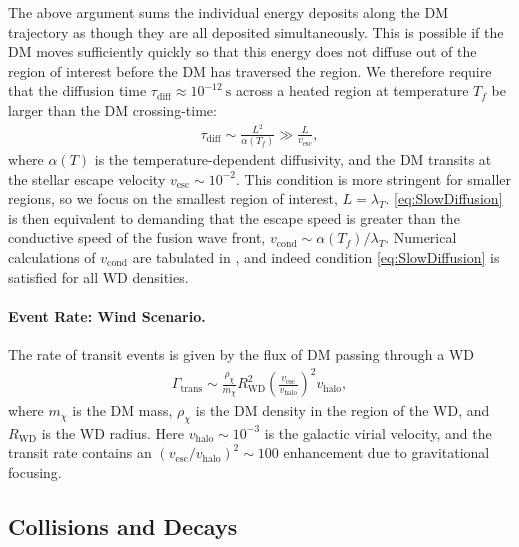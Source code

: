 \documentclass[preprintnumbers,amsmath,amssymb,prd,superscriptaddress]{revtex4}
\def\r{\right)}
\def\l{\left(}
\begin{document}
The above argument sums the individual energy deposits along the DM trajectory as though they are all deposited simultaneously.
This is possible if the DM moves sufficiently quickly so that this energy does not diffuse out of the region of interest before the DM has traversed the region.
We therefore require that the diffusion time $\tau_\text{diff} \approx 10^{-12} ~\text{s}$ across a heated region at temperature $T_f$ be larger than the DM crossing-time:
\begin{align}
  \tau_\text{diff} \sim \frac{L^2}{\alpha(T_f)} \gg
  \frac{L}{v_\text{esc}},
\label{eq:SlowDiffusion}
\end{align}
where $\alpha(T)$ is the temperature-dependent diffusivity, and the DM transits at the stellar escape velocity $v_\text{esc} \sim 10^{-2}$.
This condition is more stringent for smaller regions, so we focus on the smallest region of interest, $L = \lambda_T$.
\eqref{eq:SlowDiffusion} is then equivalent to demanding that the escape speed is greater than the conductive speed of the fusion wave front, $v_\text{cond} \sim \alpha(T_f) / \lambda_T$.
Numerical calculations of $v_\text{cond}$ are tabulated in \cite{Woosley}, and indeed condition \eqref{eq:SlowDiffusion} is satisfied for all WD densities.

\paragraph{Event Rate: Wind Scenario.}
The rate of transit events is given by the flux of DM passing through a WD
\begin{align}
  \Gamma_\text{trans} \sim
  \frac{\rho_{\chi}}{m_\chi} R_\text{WD}^2
  \l\frac{v_\text{esc}}{v_\text{halo}}\r^2 v_\text{halo},
\label{eq:TransitFluxCondition}
\end{align}
where $m_\chi$ is the DM mass, $\rho_\chi$ is the DM density in the region of the WD, and $R_\text{WD}$ is the WD radius.
Here $v_\text{halo} \sim 10^{-3}$ is the galactic virial velocity, and the transit rate contains an $(v_\text{esc}/v_\text{halo})^2 \sim 100$ enhancement due to gravitational focusing.

\subsection{Collisions and Decays}
\end{document}
